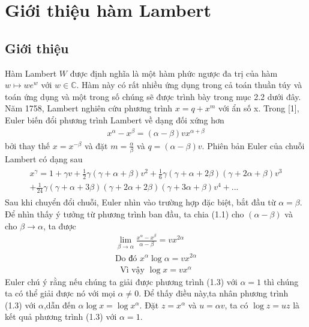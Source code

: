 \chapter{Giới thiệu hàm Lambert}
	\section{Giới thiệu}       
		Hàm Lambert $W$ được định nghĩa là một hàm phức ngược đa trị của hàm $w \mapsto we^{w}$ với $w \in \mathbb{C}$. Hàm này có rất nhiều ứng dụng trong cả toán thuần túy và toán ứng dụng và một trong số chúng sẽ được trình bày trong mục 2.2 dưới đây. \\    
		Năm 1758, Lambert nghiên cứu phương trình $x = q + x^{m}$ với ẩn số x. Trong [1], Euler biến đổi phương trình Lambert về dạng đối xứng hơn \begin{align}x^{\alpha} - x^{\beta} = (\alpha - \beta)vx^{\alpha + \beta} \end{align}
 bởi thay thế $x = x^{-\beta}$ và đặt $m = \frac{\alpha}{\beta}$ và $q = (\alpha - \beta)v$.
		Phiên bản Euler của chuỗi Lambert có dạng sau 
		\begin{align}
			\begin{split}
				x^{\gamma} = 1 + \gamma v + \frac{1}{2}\gamma(\gamma + \alpha + \beta)v^{2} + \frac{1}{6}\gamma(\gamma + \alpha + 2\beta)(\gamma + 2\alpha + \beta)v^{3} \\ + \frac{1}{24}\gamma(\gamma + \alpha + 3\beta)(\gamma + 2\alpha + 2\beta)(\gamma + 3\alpha + \beta)v^{4} + ...
			\end{split}
		\end{align}
	Sau khi chuyển đổi chuỗi, Euler nhìn vào trường hợp đặc biệt, bắt đầu từ $\alpha = \beta$. Để nhìn thấy ý tưởng từ phương trình ban đầu, ta chia (1.1) cho $(\alpha - \beta)$ và cho $\beta \rightarrow \alpha$, ta được
		\begin{align*}
			\displaystyle \lim_{\beta \to \alpha}\frac{x^{\alpha}-x^{\beta}}{\alpha - \beta} = vx^{2\alpha}\\
			\mbox{Do đó } x^{\alpha}\log \alpha = vx^{2\alpha}
		\end{align*}
		\begin{align}
			\mbox{Vì vậy } \log x = vx^{\alpha}
		\end{align}
	Euler chú ý rằng nếu chúng ta giải được phương trình (1.3) với $\alpha = 1$ thì chúng ta có thể giải được nó với mọi $\alpha \neq 0$. Để thấy điều này,ta nhân phương trình (1.3) với $\alpha$,dẫn đến $\alpha \log x = \log x^{\alpha}$. Đặt $z = x^{\alpha}$ và $u = \alpha v$, ta có $\log z = u z$ là kết quả phương trình (1.3) với $\alpha = 1$. \\
